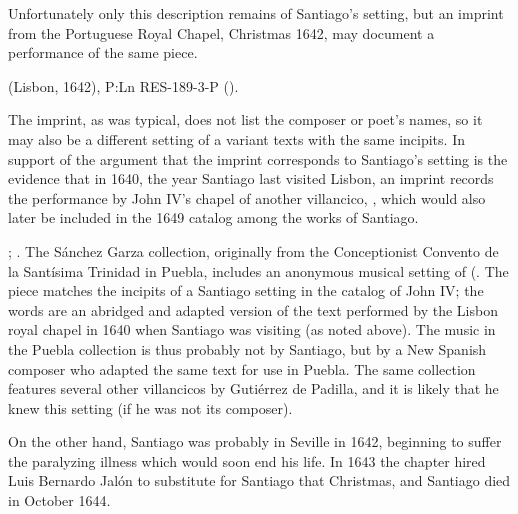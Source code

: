 Unfortunately only this description remains of Santiago's setting, but an
imprint from the Portuguese Royal Chapel, Christmas 1642, may document a
performance of the same piece.%
\begin{Footnote}
     (Lisbon, 1642), P:Ln RES-189-3-P ().
\end{Footnote}
The imprint, as was typical, does not list the composer or poet's names, so it
may also be a different setting of a variant texts with the same incipits.
In support of the argument that the imprint corresponds to Santiago's setting is
the evidence that in 1640, the year Santiago last visited Lisbon, an imprint
records the performance by John IV's chapel of another villancico, , which would also later be included in the 1649 catalog
among the works of Santiago.%
\begin{Footnote}
    ; 
    \autocite[caixão 26, ]{JohnIV:Catalog}.  
    The Sánchez Garza collection, originally from the Conceptionist Convento de
    la Santísima Trinidad in Puebla, includes an anonymous musical setting of
     (.
    The piece matches the incipits of a Santiago setting in the catalog of John
    IV; the words are an abridged and adapted version of the text performed by
    the Lisbon royal chapel in 1640 when Santiago was visiting (as noted above).
    The music in the Puebla collection is thus probably not by Santiago, but by
    a New Spanish composer who adapted the same text for use in Puebla.
    The same collection features several other villancicos by Gutiérrez de
    Padilla, and it is likely that he knew this setting (if he was not its
    composer).
\end{Footnote}
On the other hand, Santiago was probably in Seville in 1642, beginning to suffer
the paralyzing illness which would soon end his life.
In 1643 the chapter hired Luis Bernardo Jalón to substitute for Santiago that
Christmas, and Santiago died in October 1644.%
    \Autocite{Ezquerro:JalonLB}

